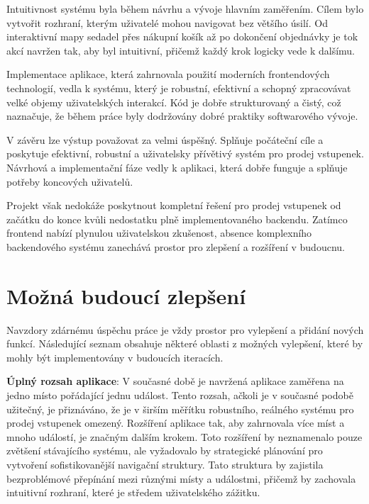 Intuitivnost systému byla během návrhu a vývoje hlavním zaměřením.
Cílem bylo vytvořit rozhraní, kterým uživatelé mohou navigovat bez většího úsilí.
Od interaktivní mapy sedadel přes nákupní košík až po dokončení objednávky je tok akcí navržen tak, aby byl intuitivní, přičemž každý krok logicky vede k dalšímu.

Implementace aplikace, která zahrnovala použití moderních frontendových technologií, vedla k systému, který je robustní, efektivní a schopný zpracovávat velké objemy uživatelských interakcí.
Kód je dobře strukturovaný a čistý, což naznačuje, že během práce byly dodržovány dobré praktiky softwarového vývoje.

V závěru lze výstup považovat za velmi úspěšný.
Splňuje počáteční cíle a poskytuje efektivní, robustní a uživatelsky přívětivý systém pro prodej vstupenek.
Návrhová a implementační fáze vedly k aplikaci, která dobře funguje a splňuje potřeby koncových uživatelů.

Projekt však nedokáže poskytnout kompletní řešení pro prodej vstupenek od začátku do konce kvůli nedostatku plně implementovaného backendu.
Zatímco frontend nabízí plynulou uživatelskou zkušenost, absence komplexního backendového systému zanechává prostor pro zlepšení a rozšíření v budoucnu.


\section*{Možná budoucí zlepšení}
\label{sec:zaver-budoucnost}
Navzdory zdárnému úspěchu práce je vždy prostor pro vylepšení a přidání nových funkcí.
Následující seznam obsahuje některé oblasti z možných vylepšení, které by mohly být implementovány v budoucích iteracích.

\textbf{Úplný rozsah aplikace}: V současné době je navržená aplikace zaměřena na jedno místo pořádající jednu událost.
Tento rozsah, ačkoli je v současné podobě užitečný, je přiznáváno, že je v širším měřítku robustního, reálného systému pro prodej vstupenek omezený.
Rozšíření aplikace tak, aby zahrnovala více míst a mnoho událostí, je značným dalším krokem.
Toto rozšíření by neznamenalo pouze zvětšení stávajícího systému, ale vyžadovalo by strategické plánování pro vytvoření sofistikovanější navigační struktury.
Tato struktura by zajistila bezproblémové přepínání mezi různými místy a událostmi, přičemž by zachovala intuitivní rozhraní, které je středem uživatelského zážitku.

